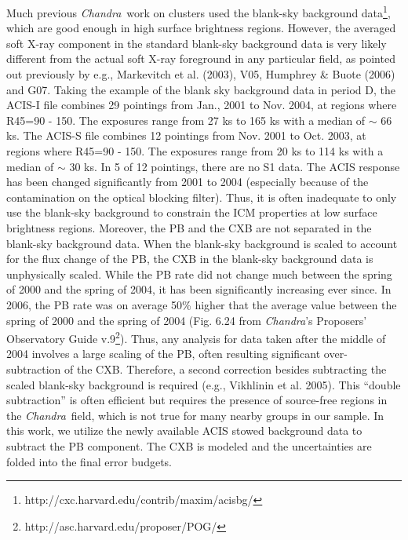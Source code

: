 \documentclass{aastex}
\def\chandra    {{\em Chandra}\/}
\begin{document}
\begin{appendix}
Much previous \chandra\ work on clusters used the blank-sky
background data\footnote{http://cxc.harvard.edu/contrib/maxim/acisbg/}, which are
good enough in high surface brightness regions.
However, the averaged soft X-ray component in the standard blank-sky background
data is very likely different from the actual soft X-ray foreground
in any particular field, as pointed out previously by e.g., Markevitch et al. (2003),
V05, Humphrey \& Buote (2006) and G07. Taking the example of the blank sky background
data in period D,
the ACIS-I file combines 29 pointings from Jan., 2001 to Nov. 2004, at regions where
R45=90 - 150. The exposures range from 27 ks to 165 ks with a median of $\sim$ 66 ks.
The ACIS-S file combines 12 pointings from Nov. 2001 to Oct. 2003, at regions where
R45=90 - 150. The exposures range from 20 ks to 114 ks with a median of $\sim$ 30 ks.
In 5 of 12 pointings, there are no S1 data. The ACIS response has been changed
significantly from 2001 to 2004 (especially because of the contamination on the optical
blocking filter). Thus, it is often inadequate to only use the blank-sky background
to constrain the ICM properties at low surface brightness regions. Moreover, the PB
and the CXB are not separated in the blank-sky background data. When the blank-sky
background is scaled to account for the flux change of the PB, the CXB in the
blank-sky background data is unphysically scaled. While the PB rate did not change
much between the spring of 2000 and the spring of 2004, it has been significantly
increasing ever since. In 2006, the PB rate was on average 50\% higher that the average
value between the spring of 2000 and the spring of 2004 (Fig. 6.24 from \chandra's
Proposers' Observatory Guide v.9\footnote{http://asc.harvard.edu/proposer/POG/}).
Thus, any analysis for data taken after the middle of 2004 involves a large scaling
of the PB, often resulting significant over-subtraction of the CXB.
Therefore, a second correction besides subtracting the scaled blank-sky background
is required (e.g., Vikhlinin et al. 2005). This ``double subtraction''
is often efficient but requires the presence of source-free regions in the
\chandra\ field, which is not true for many nearby groups in our sample.
In this work, we utilize the newly available ACIS stowed background data
to subtract the PB component. The CXB
is modeled and the uncertainties are folded into the final error budgets.


\end{appendix}
\end{document}
